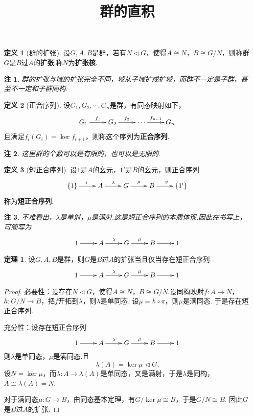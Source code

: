 \documentclass[12pt]{ctexart}
\title{\vspace{-2em}\textbf{群的直积}\vspace{-2em}}
\date{ }
\theoremstyle{definition}
\newtheorem{definition}{定义}
\newtheorem{theorem}{定理}
\theoremstyle{plain}
\newtheorem*{remark}{注}
\begin{document}
	\maketitle
	\begin{definition}[群的扩张]
		设$G,A,B$是群，若有$N\lhd G$，使得$A\cong N$，$B\cong G/N$，则称群$G$是$B$过$A$的\textbf{扩张}.称$N$为\textbf{扩张核}.
	\end{definition}
	\begin{remark}
		群的扩张与域的扩张完全不同，域从子域扩成扩域，而群不一定是子群，甚至不一定和子群同构.
	\end{remark}
	\begin{definition}[正合序列]
		设$G_1,G_2,\cdots,G_n$是群，有同态映射如下，
		\begin{displaymath}
			\xymatrix{
				G_1\ar[r]^{f_1} & G_2\ar[r]^{f_2} & \cdots\ar[r]^{f_{n-1}} & G_n
			}
		\end{displaymath}
		且满足$f_i(G_i)=\ker f_{i+1}$，则称这个序列为\textbf{正合序列}.
	\end{definition}
	\begin{remark}
		这里群的个数可以是有限的，也可以是无限的.
	\end{remark}
	\begin{definition}[短正合序列]
		设$1$是$A$的幺元，$1'$是$B$的幺元，则正合序列
		\begin{displaymath}
			\xymatrix{
				\{1\}\ar[r]^{i} & A\ar[r]^{\lambda} & G\ar[r]^{\mu} & B\ar[r]^{\varphi} & \{1'\}
			}
		\end{displaymath}
		称为\textbf{短正合序列}.
	\end{definition}
	\begin{remark}
		不难看出，$\lambda$是单射，$\mu$是满射.这是短正合序列的本质体现.因此在书写上，可简写为
		\begin{displaymath}
			\xymatrix{
				1\ar[r] & A\ar[r]^{\lambda} & G\ar[r]^{\mu} & B\ar[r] & 1
			}
		\end{displaymath}
	\end{remark}
	\begin{theorem}\label{iffshort}
		设$G,A,B$是群，则$G$是$B$过$A$的扩张当且仅当存在短正合序列
		\begin{displaymath}
			\xymatrix{
				1\ar[r] & A\ar[r]^{\lambda} & G\ar[r]^{\mu} & B\ar[r] & 1
			}
		\end{displaymath}
	\end{theorem}
	\begin{proof}
		必要性：设存在$N\lhd G$，使得$A\cong N$，$B\cong G/N$.设同构映射$f:A\to N$，$h:G/N\to B$，把$f$开拓到$\lambda$，则$\lambda$是单同态. 设$\mu=h\circ \pi$，则$\mu$是满同态. 于是存在短正合序列.
		
		充分性：设存在短正合序列
		\begin{displaymath}
			\xymatrix{
				1\ar[r] & A\ar[r]^{\lambda} & G\ar[r]^{\mu} & B\ar[r] & 1
			}
		\end{displaymath}
		则$\lambda$是单同态，$\mu$是满同态.且
		$$\lambda(A)=\ker\mu\lhd G.$$
		设$N=\ker\mu$，而$\lambda:A\to\lambda(A)$是单同态，又是满射，于是$\lambda$是同构，$A\cong\lambda(A)=N$.
		
		对于满同态$\mu:G\to B$，由同态基本定理，有$G/\ker\mu\cong B$，于是$G/N\cong B$. 因此$G$是$B$过$A$的扩张.
	\end{proof}
\end{document}
